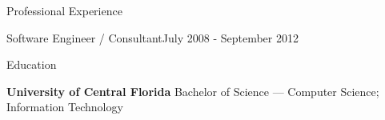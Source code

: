 \documentclass{resume} %
\begin{document}
\begin{rSection}{Professional Experience}
  
  \begin{rCompany}{Software Engineer / Consultant}{July 2008 - September 2012}{}

  \end{rCompany}
  
  
  
\end{rSection}

\vspace{0.5em} %
\begin{rSection}{Education}
  
  {\bf University of Central Florida } Bachelor of Science --- Computer Science; Information Technology
  
\end{rSection}
\end{document}
